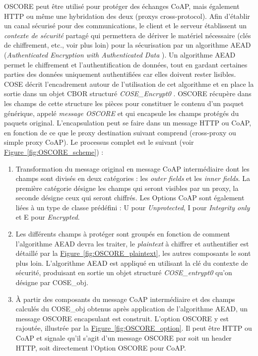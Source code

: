 \documentclass[]{report}
\newcommand{\wordlink}[2]{\hyperref[#2]{#1~\ref{#2}}}
\begin{document}
\newpage

\par OSCORE peut être utilisé pour protéger des échanges CoAP, mais également HTTP ou même une hybridation des deux (proxys cross-protocol). Afin d'établir un canal sécurisé pour des communications, le client et le serveur établissent un \textit{contexte de sécurité} partagé qui permettera de dériver le matériel nécessaire (clés de chiffrement, etc., voir plus loin) pour la sécurisation par un algorithme AEAD (\textit{Authenticated Encryption with Authenticated Data} \cite{rfc5116}). Un algorithme AEAD permet le chiffrement et l'authentification de données, tout en gardant certaines parties des données uniquement authentifiées car elles doivent rester lisibles. COSE décrit l'encadrement autour de l'utilisation de cet algorithme et en place la sortie dans un objet CBOR structuré \textit{COSE\_Encrypt0}  \cite{rfc8152}. OSCORE récupère dans les champs de cette structure les pièces pour constituer le contenu d'un paquet générique, appelé \textit{message OSCORE} et qui encapsule les champs protégés du paquets original. L'encapsulation peut se faire dans un message HTTP ou CoAP, en fonction de ce que le proxy destination suivant comprend (cross-proxy ou simple proxy CoAP). Le processus complet est le suivant (voir \wordlink{Figure}{fig:OSCORE_scheme}) :

\vspace{0.1cm}
\begin{enumerate}
\item Transformation du message original en message CoAP intermédiaire dont les champs sont divisés en deux catégories : les \textit{outer fields} et les \textit{inner fields}. La première catégorie désigne les champs qui seront visibles par un proxy, la seconde désigne ceux qui seront chiffrés. Les Options CoAP sont également liées à un type de classe prédéfini : U pour \textit{Unprotected}, I pour \textit{Integrity only} et E pour \textit{Encrypted}.
\vspace{0.2cm}
\item Les différents champs à protéger sont groupés en fonction de comment l'algorithme AEAD devra les traiter, le \textit{plaintext} à chiffrer et authentifier est détaillé par la \wordlink{Figure}{fig:OSCORE_plaintext}, les autres composants le sont plus loin. L'algorithme AEAD est appliqué en utilisant la clé du contexte de sécurité, produisant en sortie un objet structuré \textit{COSE\_entrypt0} qu'on désigne par COSE\_obj.
\vspace{0.2cm}
\item À partir des composants du message CoAP intermédiaire et des champs calculés du COSE\_obj obtenus après application de l'algorithme AEAD, un message OSCORE encapsulant est construit. L'option OSCORE y est rajoutée, illustrée par la \wordlink{Figure}{fig:OSCORE_option}. Il peut être HTTP ou CoAP et signale qu'il s'agit d'un message OSCORE par soit un header HTTP, soit directement l'Option OSCORE pour CoAP.
\end{enumerate}
\end{document}
